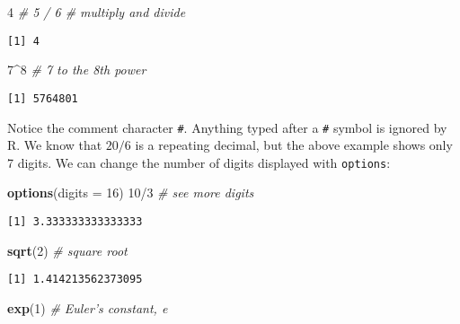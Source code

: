 \documentclass[]{book}
\newenvironment{Shaded}{\begin{snugshade}}{\end{snugshade}}
\newcommand{\KeywordTok}[1]{\textcolor[rgb]{0.13,0.29,0.53}{\textbf{{#1}}}}
\newcommand{\DataTypeTok}[1]{\textcolor[rgb]{0.13,0.29,0.53}{{#1}}}
\newcommand{\DecValTok}[1]{\textcolor[rgb]{0.00,0.00,0.81}{{#1}}}
\newcommand{\CommentTok}[1]{\textcolor[rgb]{0.56,0.35,0.01}{\textit{{#1}}}}
\newcommand{\NormalTok}[1]{{#1}}
\numberwithin{equation}{chapter}
\numberwithin{figure}{chapter}
\theoremstyle{plain}
\theoremstyle{definition}
\theoremstyle{remark}
\theoremstyle{definition}
\theoremstyle{definition}
\theoremstyle{remark}
\begin{document}
\begin{Shaded}
\begin{Highlighting}[]
\DecValTok{4} \CommentTok{# 5 / 6   # multiply and divide}
\end{Highlighting}
\end{Shaded}

\begin{verbatim}
[1] 4
\end{verbatim}

\begin{Shaded}
\begin{Highlighting}[]
\DecValTok{7}\NormalTok{^}\DecValTok{8}         \CommentTok{# 7 to the 8th power}
\end{Highlighting}
\end{Shaded}

\begin{verbatim}
[1] 5764801
\end{verbatim}

Notice the comment character \texttt{\#}. Anything typed after a
\texttt{\#} symbol is ignored by R. We know that \(20/6\) is a repeating
decimal, but the above example shows only 7 digits. We can change the
number of digits displayed with \texttt{options}:

\begin{Shaded}
\begin{Highlighting}[]
\KeywordTok{options}\NormalTok{(}\DataTypeTok{digits =} \DecValTok{16}\NormalTok{)}
\DecValTok{10}\NormalTok{/}\DecValTok{3}                 \CommentTok{# see more digits}
\end{Highlighting}
\end{Shaded}

\begin{verbatim}
[1] 3.333333333333333
\end{verbatim}

\begin{Shaded}
\begin{Highlighting}[]
\KeywordTok{sqrt}\NormalTok{(}\DecValTok{2}\NormalTok{)              }\CommentTok{# square root}
\end{Highlighting}
\end{Shaded}

\begin{verbatim}
[1] 1.414213562373095
\end{verbatim}

\begin{Shaded}
\begin{Highlighting}[]
\KeywordTok{exp}\NormalTok{(}\DecValTok{1}\NormalTok{)               }\CommentTok{# Euler's constant, e}
\end{Highlighting}
\end{Shaded}
\end{document}
